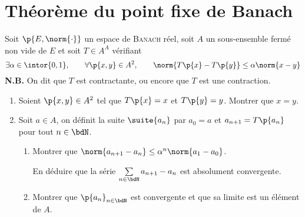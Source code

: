 \documentclass[a4paper,french,bookmarks]{article}
\begin{document}
    \section{Théorème du point fixe de Banach}
    
    Soit $\p{E, \norm{\cdot}}$ un espace de \textsc{Banach} réel, soit $A$ un sous-ensemble fermé non vide de $E$ et soit $T \in A^A$ vérifiant
    \[ \exists \alpha \in \intor{0, 1},\qquad \forall \p{x, y} \in A^2,\qquad \norm{T\p{x} - T\p{y}} \leq \alpha \norm{x - y}\]
    \textbf{\sffamily N.B.} On dit que $T$ est contractante, ou encore que $T$ est une contraction.
    
    \begin{enumerate}
        \item Soient $\p{x, y} \in A^2$ tel que $T\p{x} = x$ et $T\p{y} = y$. Montrer que $x = y$.
        
        
        \item Soit $a \in A$, on définit la suite $\suite{a_n}$ par $a_0 = a$ et $a_{n+1} = T\p{a_n}$ pour tout $n \in \bdN$.
        
        \begin{enumerate}
            \item Montrer que $\norm{a_{n+1} - a_n} \leq \alpha^n \norm{a_1 - a_0}$.
            
            En déduire que la série $\sum\limits_{n \in \bdN} a_{n+1} - a_n$ est absolument convergente.
            
            
            \item Montrer que $\p{a_n}_{n \in \bdN}$ est convergente et que sa limite est un élément de $A$. 
            

\end{enumerate}
\end{enumerate}
\end{document}

